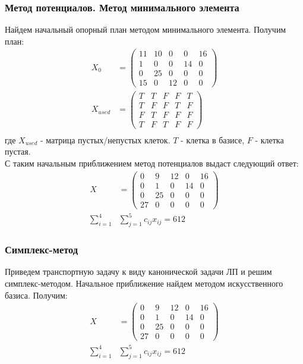 \subsubsection{Метод потенциалов. Метод минимального элемента}
Найдем начальный опорный план методом минимального элемента. Получим план:
\begin{align*}
	X_0 &=
		\begin{pmatrix} 
			11 & 10 & 0 & 0 & 16 \\ 
			1 & 0 & 0 & 14 & 0 \\ 
			0 & 25 & 0 & 0 & 0 \\ 
			15 & 0 & 12 & 0 & 0
		\end{pmatrix} \\
	X_{used} &=
		\begin{pmatrix} 
			T & T & F & F & T \\ 
			T & F & F & T & F \\ 
			F & T & F & F & F \\ 
			T & F & T & F & F
		\end{pmatrix} \\
\end{align*}
где $X_{used}$ - матрица пустых/непустых клеток. $T$ - клетка в базисе, $F$ - клетка пустая. \\
С таким начальным приближением метод потенциалов выдаст следующий ответ:
\begin{align*}
	X &=
		\begin{pmatrix} 
			0 & 9 & 12 & 0 & 16 \\ 
			0 & 1 & 0 & 14 & 0 \\ 
			0 & 25 & 0 & 0 & 0 \\ 
			27 & 0 & 0 & 0 & 0
		\end{pmatrix} \\
	\sum_{i=1}^4 &\sum_{j=1}^5 c_{ij} x_{ij} = 612
\end{align*}

\subsubsection{Симплекс-метод}
Приведем транспортную задачу к виду канонической задачи ЛП и решим симплекс-методом. Начальное приближение найдем методом искусственного базиса. Получим:
\begin{align*}
	X &=
		\begin{pmatrix} 
			0 & 9 & 12 & 0 & 16 \\ 
			0 & 1 & 0 & 14 & 0 \\ 
			0 & 25 & 0 & 0 & 0 \\ 
			27 & 0 & 0 & 0 & 0
		\end{pmatrix} \\
	\sum_{i=1}^4 &\sum_{j=1}^5 c_{ij} x_{ij} = 612
\end{align*}


